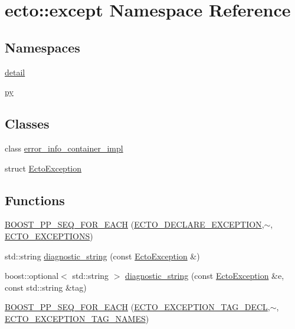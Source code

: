 \hypertarget{namespaceecto_1_1except}{\section{ecto\-:\-:except Namespace Reference}
\label{namespaceecto_1_1except}
}
\subsection*{Namespaces}
\begin{DoxyCompactItemize}
\item 
\hyperlink{namespaceecto_1_1except_1_1detail}{detail}
\item 
\hyperlink{namespaceecto_1_1except_1_1py}{py}
\end{DoxyCompactItemize}
\subsection*{Classes}
\begin{DoxyCompactItemize}
\item 
class \hyperlink{classecto_1_1except_1_1error__info__container__impl}{error\-\_\-info\-\_\-container\-\_\-impl}
\item 
struct \hyperlink{structecto_1_1except_1_1EctoException}{Ecto\-Exception}
\end{DoxyCompactItemize}
\subsection*{Functions}
\begin{DoxyCompactItemize}
\item 
\hyperlink{namespaceecto_1_1except_a6ed4b851e67551e870e933f85628cb6f}{B\-O\-O\-S\-T\-\_\-\-P\-P\-\_\-\-S\-E\-Q\-\_\-\-F\-O\-R\-\_\-\-E\-A\-C\-H} (\hyperlink{except_8hpp_a9b77695b9c45c36934e7c890ce6f682f}{E\-C\-T\-O\-\_\-\-D\-E\-C\-L\-A\-R\-E\-\_\-\-E\-X\-C\-E\-P\-T\-I\-O\-N},$\sim$, \hyperlink{except_8hpp_ad3bbab1baffa25e20db0635270c5f108}{E\-C\-T\-O\-\_\-\-E\-X\-C\-E\-P\-T\-I\-O\-N\-S})
\item 
std\-::string \hyperlink{namespaceecto_1_1except_a8161938bf962eaf02d9b0e73b80a5c4a}{diagnostic\-\_\-string} (const \hyperlink{structecto_1_1except_1_1EctoException}{Ecto\-Exception} \&)
\item 
boost\-::optional$<$ std\-::string $>$ \hyperlink{namespaceecto_1_1except_abebe710f45e8d06b2df19d02bf15b193}{diagnostic\-\_\-string} (const \hyperlink{structecto_1_1except_1_1EctoException}{Ecto\-Exception} \&e, const std\-::string \&tag)
\item 
\hyperlink{namespaceecto_1_1except_a8744cfe3c8d4364696873aeb175c68b9}{B\-O\-O\-S\-T\-\_\-\-P\-P\-\_\-\-S\-E\-Q\-\_\-\-F\-O\-R\-\_\-\-E\-A\-C\-H} (\hyperlink{except_8hpp_a4a4f231e4fe0f923cd9ee3a48803ca30}{E\-C\-T\-O\-\_\-\-E\-X\-C\-E\-P\-T\-I\-O\-N\-\_\-\-T\-A\-G\-\_\-\-D\-E\-C\-L},$\sim$, \hyperlink{except_8hpp_a6a632b3827deba566cbca48b37bf53e2}{E\-C\-T\-O\-\_\-\-E\-X\-C\-E\-P\-T\-I\-O\-N\-\_\-\-T\-A\-G\-\_\-\-N\-A\-M\-E\-S})
\end{DoxyCompactItemize}


